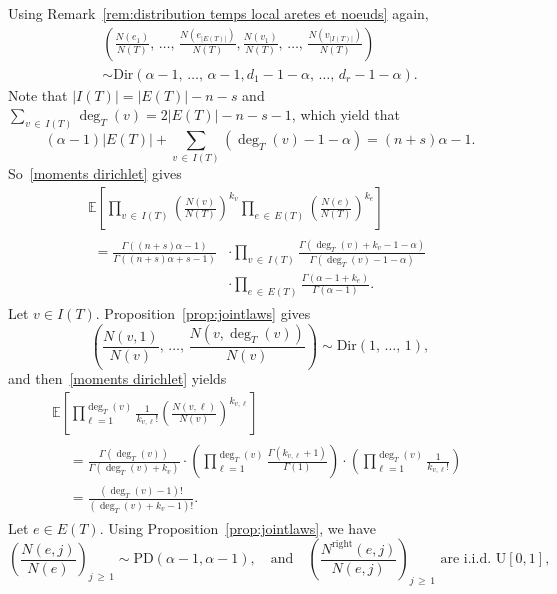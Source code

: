 \documentclass[AHL,Unicode,longabstracts,published]{cedram}
\newcommand{\Ec}[1]{\mathbb{E} \left[#1\right]}
\newcommand{\abs}[1]{\left\lvert#1\right\rvert}
\newcommand{\PD}{\mathrm{PD}}
\newcommand{\Rightll}{\mathrm{right}}
\newcommand{\rmU}{\mathrm{U}}
\newcommand{\Dir}{\mathrm{Dir}}
\begin{document}
Using Remark~\ref{rem:distribution temps local aretes et noeuds} again,
\begin{multline*}
\left(\frac{N(e_1)}{N(T)},\,\dots,\,\frac{N\left(e_{\abs{E(T)}}\right)}{N(T)},\frac{N(v_1)}{N(T)},\,\dots,\,\frac{N\left(v_{\abs{I(T)}}\right)}{N(T)}\right) \\
\sim \Dir\left(\alpha-1,\,\dots,\,\alpha-1,d_1-1-\alpha,\, \dots,\,d_r-1-\alpha\right).
\end{multline*}
Note that $|I(T)| = |E(T)| - n - s$ and $\sum_{v\,\in\,I(T)} \deg_T(v) = 2 |E(T)| - n - s -1$, which yield that
\[
(\alpha-1)|E(T)| + \sum_{v\,\in\,I(T)} \left(\deg_T(v) - 1 - \alpha\right) = (n+s) \alpha - 1.
\]
So~\eqref{moments dirichlet} gives
\begin{multline*}
\Ec{\prod_{v\,\in\,I(T)}\left(\frac{N(v)}{N(T)}\right)^{k_v} \prod_{e\,\in\,E(T)}\left(\frac{N(e)}{N(T)}\right)^{k_e} }\\
\begin{aligned}
 =\frac{\Gamma\left((n+s)\alpha-1\right)}{\Gamma\left((n+s)\alpha+s-1\right)} &\cdot\prod_{v\,\in\,I(T)}\frac{\Gamma\left(\deg_T(v)+k_v-1-\alpha\right)}{\Gamma\left(\deg_T(v)-1-\alpha\right)}\\ &\cdot \prod_{e\,\in\,E(T)}\frac{\Gamma\left(\alpha-1+k_e\right)}{\Gamma(\alpha-1)}.
\end{aligned}
\end{multline*}
Let $v\in I(T)$. Proposition~\ref{prop:jointlaws} gives
\[
\left(\frac{N(v,1)}{N(v)},\,\dots,\,\frac{N\left(v,\deg_T(v)\right)}{N(v)}\right)\sim \Dir(1,\,\dots,\,1),
\]
and then~\eqref{moments dirichlet} yields
\begin{multline*}
\Ec{\prod_{\ell=1}^{\deg_T(v)}\frac{1}{k_{v,\ell}!}\left(\frac{N(v,\ell)}{N(v)}\right)^{k_{v,\ell}}}\\
\begin{aligned}
&=\frac{\Gamma\left(\deg_T(v)\right)}{\Gamma\left(\deg_T(v)+k_v\right)}\cdot \left(\prod_{\ell =1}^{\deg_T(v)}\frac{\Gamma\left(k_{v,\ell}+1\right)}{\Gamma(1)}\right)\cdot \left(\prod_{\ell=1}^{\deg_T(v)} \frac{1}{k_{v,\ell}!}\right)\\
&=\frac{\left(\deg_T(v)-1\right)!}{\left(\deg_T(v)+k_v-1\right)!}.
\end{aligned}
\end{multline*}
Let $e\in E(T)$. Using Proposition~\ref{prop:jointlaws}, we have
\[
\left(\frac{N(e,j)}{N(e)}\right)_{j\,\geq\,1}\sim \PD\left(\alpha-1,\alpha-1\right), \quad \text{and} \quad \left(\frac{N^{\Rightll}(e,j)}{N(e,j)}\right)_{j\,\geq\,1} \text{ are i.i.d.\ }\rmU[0,1],
\]
\end{document}
